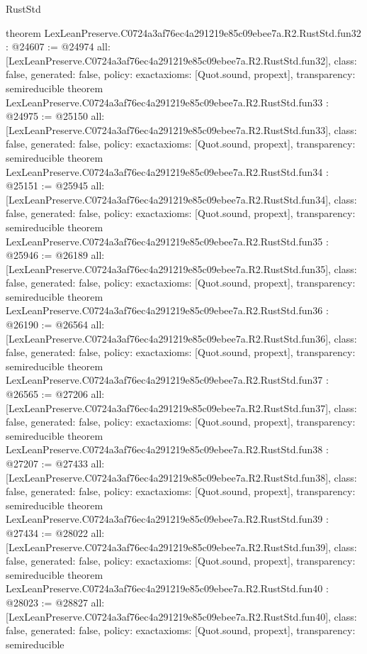 \begin{lexlean}{RustStd}
\begin{coremodule}
{}
theorem LexLeanPreserve.C0724a3af76ec4a291219e85c09ebee7a.R2.RustStd.fun32 : @24607 := @24974 {
  all: [LexLeanPreserve.C0724a3af76ec4a291219e85c09ebee7a.R2.RustStd.fun32],
  class: false,
  generated: false,
  policy: exact{axioms: [Quot.sound, propext]},
  transparency: semireducible
}
theorem LexLeanPreserve.C0724a3af76ec4a291219e85c09ebee7a.R2.RustStd.fun33 : @24975 := @25150 {
  all: [LexLeanPreserve.C0724a3af76ec4a291219e85c09ebee7a.R2.RustStd.fun33],
  class: false,
  generated: false,
  policy: exact{axioms: [Quot.sound, propext]},
  transparency: semireducible
}
theorem LexLeanPreserve.C0724a3af76ec4a291219e85c09ebee7a.R2.RustStd.fun34 : @25151 := @25945 {
  all: [LexLeanPreserve.C0724a3af76ec4a291219e85c09ebee7a.R2.RustStd.fun34],
  class: false,
  generated: false,
  policy: exact{axioms: [Quot.sound, propext]},
  transparency: semireducible
}
theorem LexLeanPreserve.C0724a3af76ec4a291219e85c09ebee7a.R2.RustStd.fun35 : @25946 := @26189 {
  all: [LexLeanPreserve.C0724a3af76ec4a291219e85c09ebee7a.R2.RustStd.fun35],
  class: false,
  generated: false,
  policy: exact{axioms: [Quot.sound, propext]},
  transparency: semireducible
}
theorem LexLeanPreserve.C0724a3af76ec4a291219e85c09ebee7a.R2.RustStd.fun36 : @26190 := @26564 {
  all: [LexLeanPreserve.C0724a3af76ec4a291219e85c09ebee7a.R2.RustStd.fun36],
  class: false,
  generated: false,
  policy: exact{axioms: [Quot.sound, propext]},
  transparency: semireducible
}
theorem LexLeanPreserve.C0724a3af76ec4a291219e85c09ebee7a.R2.RustStd.fun37 : @26565 := @27206 {
  all: [LexLeanPreserve.C0724a3af76ec4a291219e85c09ebee7a.R2.RustStd.fun37],
  class: false,
  generated: false,
  policy: exact{axioms: [Quot.sound, propext]},
  transparency: semireducible
}
theorem LexLeanPreserve.C0724a3af76ec4a291219e85c09ebee7a.R2.RustStd.fun38 : @27207 := @27433 {
  all: [LexLeanPreserve.C0724a3af76ec4a291219e85c09ebee7a.R2.RustStd.fun38],
  class: false,
  generated: false,
  policy: exact{axioms: [Quot.sound, propext]},
  transparency: semireducible
}
theorem LexLeanPreserve.C0724a3af76ec4a291219e85c09ebee7a.R2.RustStd.fun39 : @27434 := @28022 {
  all: [LexLeanPreserve.C0724a3af76ec4a291219e85c09ebee7a.R2.RustStd.fun39],
  class: false,
  generated: false,
  policy: exact{axioms: [Quot.sound, propext]},
  transparency: semireducible
}
theorem LexLeanPreserve.C0724a3af76ec4a291219e85c09ebee7a.R2.RustStd.fun40 : @28023 := @28827 {
  all: [LexLeanPreserve.C0724a3af76ec4a291219e85c09ebee7a.R2.RustStd.fun40],
  class: false,
  generated: false,
  policy: exact{axioms: [Quot.sound, propext]},
  transparency: semireducible
}
\end{coremodule}
\end{lexlean}
